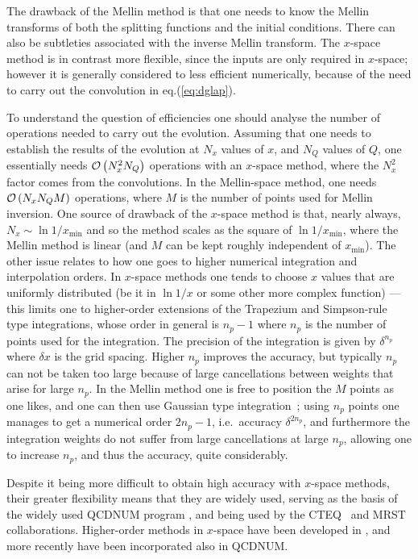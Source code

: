 \documentclass[12pt]{article}
\newcommand{\ie}{i.e.\ }
\newcommand{\order}[1]{{\cal O}\left(#1\right)}
\begin{document}
The drawback of the Mellin method is that one needs to know the Mellin
transforms of both the splitting functions and the initial conditions.
There can also be subtleties associated with the inverse Mellin
transform.
%
The $x$-space method is in contrast more flexible, since the inputs
are only required in $x$-space; however it is generally considered to
less efficient numerically, because of the need to carry out the
convolution in eq.(\ref{eq:dglap}).

To understand the question of efficiencies one should analyse the
number of operations needed to carry out the evolution. Assuming that
one needs to establish the results of the evolution at $N_x$ values of
$x$, and $N_Q$ values of $Q$, one essentially needs $\order{N_x^2
  N_Q}$ operations with an $x$-space method, where the $N_x^2$ factor
comes from the convolutions. In the Mellin-space method, one needs
$\order{N_x N_Q M}$ operations, where $M$ is the number of points used
for Mellin inversion. One source of drawback of the $x$-space method
is that, nearly always, $N_x \sim \ln 1/x_{\min}$ and so the method
scales as the square of $\ln 1/x_{\min}$, where the Mellin method is
linear (and $M$ can be kept roughly independent of $x_{\min}$). 
%
The other issue relates to how one goes to higher numerical
integration and interpolation orders.
%
In $x$-space methods one tends to choose $x$ values that are uniformly
distributed (be it in $\ln 1/x$ or some other more complex function)
--- this limits one to higher-order extensions of the Trapezium and
Simpson-rule type integrations, whose order in general is $n_p-1$
where $n_p$ is the number of points used for the integration. The
precision of the integration is given by $\delta^{n_p}$ where
$\delta x$ is the grid spacing. Higher $n_p$ improves the accuracy,
but typically $n_p$ can not be taken too large because of large
cancellations between weights that arise for large $n_p$.
%
In the Mellin method one is free to position the $M$ points as one
likes, and one can then use Gaussian type
integration~\cite{Kosower,Weinzierl:2002mv,Pegasus}; using $n_p$
points one manages to get a numerical order $2n_p-1$, \ie accuracy
$\delta^{2n_p}$, and furthermore the integration weights do not suffer
from large cancellations at large $n_p$, allowing one to increase
$n_p$, and thus the accuracy, quite considerably.

Despite it being more difficult to obtain high accuracy with $x$-space
methods, their greater flexibility means that they are widely used,
serving as the basis of the widely used QCDNUM program \cite{Botje},
and being used by the CTEQ~\cite{CTEQ} and MRST~\cite{MRST}
collaborations. Higher-order methods in $x$-space have been developed
in \cite{Schoeffel:1998tz,Pascaud:2001bi,coriano,GuzziThesis}, and
more recently have been incorporated also in QCDNUM.
\end{document}
